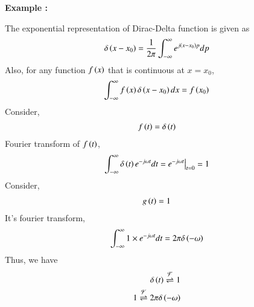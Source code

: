 \documentclass[journal,12pt,twocolumn]{IEEEtran}
\begin{document}
\textbf{Example :}

The exponential representation of Dirac-Delta function is given as
\begin{align}
    \delta\left(x-x_0\right) = \frac{1}{2\pi} \int_{-\infty}^{\infty} e^{j\left(x-x_0\right)p} dp
\end{align}
Also, for any function $f\left(x\right)$ that is continuous at $x = x_0$,
\begin{align}
    \int_{-\infty}^{\infty} f\left(x\right)\delta\left(x-x_0\right) dx = f\left(x_0\right)
\end{align}
Consider,
\begin{align}
    f\left(t\right) = \delta\left(t\right)
\end{align}
Fourier transform of $f\left(t\right)$,
\begin{align}
    \int_{-\infty}^{\infty} \delta\left(t\right) e^{-j\omega t} dt = e^{-j\omega t}\big{|}_{t = 0} = 1
\end{align}
Consider,
\begin{align}
    g\left(t\right) = 1
\end{align}
It's fourier transform,
\begin{align}
    \int_{-\infty}^{\infty}1\times e^{-j\omega t} dt = 2\pi \delta\left(-\omega\right)
\end{align}
Thus, we have
\begin{align}
    \delta\left(t\right) \overset{\mathcal{F}}{ \rightleftharpoons} 1\\
    1 \overset{\mathcal{F}}{ \rightleftharpoons}2\pi{\delta} \left(-\omega\right)
\end{align}
\end{document}
